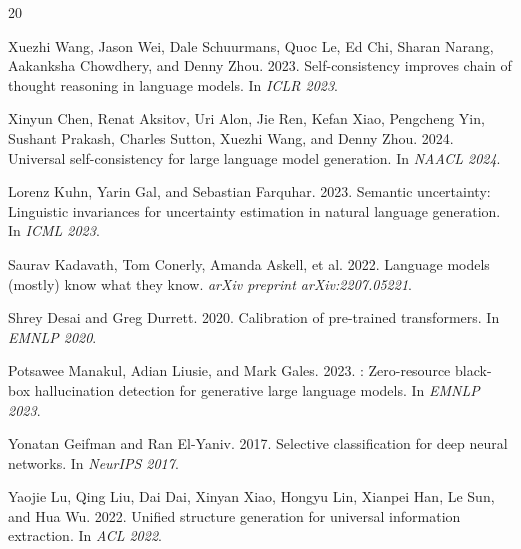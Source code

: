 \documentclass[11pt,a4paper]{article}
\begin{document}
\begin{thebibliography}{20}

Xuezhi Wang, Jason Wei, Dale Schuurmans, Quoc Le, Ed Chi, Sharan Narang, Aakanksha Chowdhery, and Denny Zhou. 2023.
\newblock Self-consistency improves chain of thought reasoning in language models.
\newblock In \emph{ICLR 2023}.

Xinyun Chen, Renat Aksitov, Uri Alon, Jie Ren, Kefan Xiao, Pengcheng Yin, Sushant Prakash, Charles Sutton, Xuezhi Wang, and Denny Zhou. 2024.
\newblock Universal self-consistency for large language model generation.
\newblock In \emph{NAACL 2024}.

Lorenz Kuhn, Yarin Gal, and Sebastian Farquhar. 2023.
\newblock Semantic uncertainty: Linguistic invariances for uncertainty estimation in natural language generation.
\newblock In \emph{ICML 2023}.

Saurav Kadavath, Tom Conerly, Amanda Askell, et al. 2022.
\newblock Language models (mostly) know what they know.
\newblock \emph{arXiv preprint arXiv:2207.05221}.

Shrey Desai and Greg Durrett. 2020.
\newblock Calibration of pre-trained transformers.
\newblock In \emph{EMNLP 2020}.

Potsawee Manakul, Adian Liusie, and Mark Gales. 2023.
: Zero-resource black-box hallucination detection for generative large language models.
\newblock In \emph{EMNLP 2023}.

Yonatan Geifman and Ran El-Yaniv. 2017.
\newblock Selective classification for deep neural networks.
\newblock In \emph{NeurIPS 2017}.

Yaojie Lu, Qing Liu, Dai Dai, Xinyan Xiao, Hongyu Lin, Xianpei Han, Le Sun, and Hua Wu. 2022.
\newblock Unified structure generation for universal information extraction.
\newblock In \emph{ACL 2022}.


\end{thebibliography}
\end{document}
